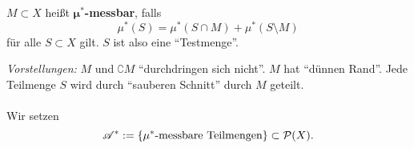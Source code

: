 \begin{definition}
\begin{mdframed}
$M\subset X$ heißt \textbf{$\boldsymbol\mu^{\boldsymbol*}$-messbar}, falls 
\begin{equation*}
\mu^*(S)=\mu^*(S\cap M) + \mu^*(S\setminus M)
\end{equation*}
für alle $S\subset X$ gilt. \footnotesize{$S$ ist also eine ``Testmenge''.}
\end{mdframed}
\end{definition}
\textit{Vorstellungen:} $M$ und $\complement M$ ``durchdringen sich nicht''. $M$ hat ``dünnen Rand''. Jede Teilmenge $S$ wird durch ``sauberen Schnitt'' durch $M$ geteilt.\\\\
Wir setzen
$$\mathscr{A}^*:=\{\mu^*\text{-messbare Teilmengen}\}\subset \mathcal{P}(X).$$
